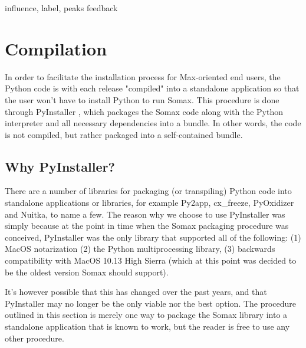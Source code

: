 influence, label, peaks
feedback






\section{Compilation}\label{ssec:2-compilation}

In order to facilitate the installation process for Max-oriented end users, the Python code is with each release "compiled" into a standalone application so that the user won't have to install Python to run Somax. This procedure is done through PyInstaller \cite{pyinstaller2023}, which packages the Somax code along with the Python interpreter and all necessary dependencies into a bundle. In other words, the code is not compiled, but rather packaged into a self-contained bundle.


\subsection{Why PyInstaller?}\label{ssec:2-why-pyinstaller}
There are a number of libraries for packaging (or transpiling) Python code into standalone applications or libraries, for example Py2app, cx\_freeze, PyOxidizer and Nuitka, to name a few. The reason why we choose to use PyInstaller was simply because at the point in time when the Somax packaging procedure was conceived, PyInstaller was the only library that supported all of the following: (1) MacOS notarization (2) the Python multiprocessing library, (3) backwards compatibility with MacOS 10.13 High Sierra (which at this point was decided to be the oldest version Somax should support). 

It's however possible that this has changed over the past years, and that PyInstaller may no longer be the only viable nor the best option. The procedure outlined in this section is merely one way to package the Somax library into a standalone application that is known to work, but the reader is free to use any other procedure.


